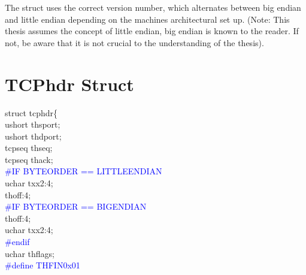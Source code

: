 \documentclass{uathesis}
\begin{document}
\begin{appendices}
The struct uses the correct version number, which alternates between big endian and little endian depending on the machines architectural set up. (Note: This thesis assumes the concept  of little endian, big endian is known to the reader. If not, be aware that it is not crucial to the understanding of the thesis). 


  \section{TCPhdr Struct}
  
\noindent struct tcphdr\big\{\\
 u\textunderscore short\hspace{5mm} th\textunderscore sport;\\
 u\textunderscore short\hspace{5mm} th\textunderscore dport;\\
 tcp\textunderscore seq\hspace{5mm} th\textunderscore seq;\\
 tcp\textunderscore seq\hspace{5mm} th\textunderscore ack;\\
\noindent\textcolor{blue}{{\#}IF BYTE\textunderscore ORDER == LITTLE\textunderscore ENDIAN} \\
 u\textunderscore char\phantom{t}\hspace{5mm} tx\textunderscore x2:4;\\
 \phantom{u\textunderscore short}\hspace{5mm} th\textunderscore off:4;\\
\noindent\textcolor{blue}{{\#}IF BYTE\textunderscore ORDER == BIG\textunderscore ENDIAN} \\
 \phantom{u\textunderscore short}\hspace{5mm} th\textunderscore off:4;\\
 u\textunderscore char\phantom{t}\hspace{5mm} tx\textunderscore x2:4;\\
\noindent\textcolor{blue}{{\#}endif} \\
 u\textunderscore char\phantom{t}\hspace{5mm} th\textunderscore flags;\\
\noindent\textcolor{blue}{{\#}define TH\textunderscore FIN\hspace{4.9mm}0x01}\\

\end{appendices}
\end{document}
